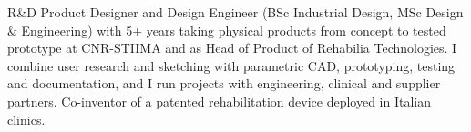 {R\&D Product Designer and Design Engineer (BSc Industrial Design, MSc Design \& Engineering) with 5+ years taking physical products from concept to tested prototype at CNR-STIIMA and as Head of Product of Rehabilia Technologies. I combine user research and sketching with parametric CAD, prototyping, testing and documentation, and I run projects with engineering, clinical and supplier partners. Co-inventor of a patented rehabilitation device deployed in Italian clinics.}
